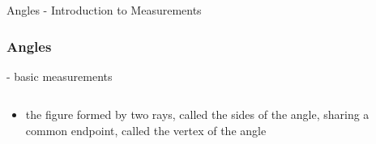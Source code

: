 \begin{omgroup}{Angles - Introduction to Measurements}
\begin{module}[id=angle]
\begin{frame}
  \frametitle{Angles}
  - basic measurements\\
  \begin{columns}
    \begin{column}{5.8cm}
      \begin{itemize}
      \item
      \begin{definition}
         the figure formed by two rays, called the sides of the angle, sharing a common endpoint, called the vertex of the angle
      \end{definition}
    \end{itemize}
    \end{column}
    \begin{column}{5.5cm}
    \end{column}
  \end{columns}
\end{frame}
\end{module}
\end{omgroup}

